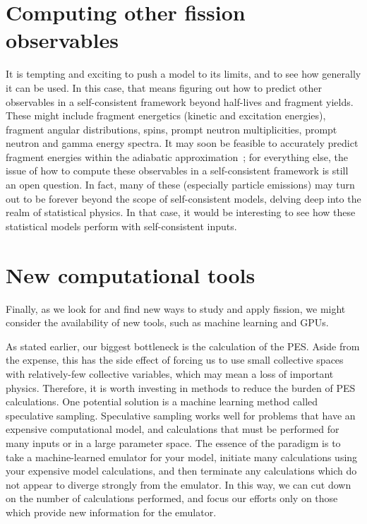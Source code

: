

\section{Computing other fission observables}
It is tempting and exciting to push a model to its limits, and to see how generally it can be used. In this case, that means figuring out how to predict other observables in a self-consistent framework beyond half-lives and fragment yields. These might include fragment energetics (kinetic and excitation energies), fragment angular distributions, spins, prompt neutron multiplicities, prompt neutron and gamma energy spectra. It may soon be feasible to accurately predict fragment energies within the adiabatic approximation~\cite{Younes2011}; for everything else, the issue of how to compute these observables in a self-consistent framework is still an open question. In fact, many of these (especially particle emissions) may turn out to be forever beyond the scope of self-consistent models, delving deep into the realm of statistical physics. In that case, it would be interesting to see how these statistical models perform with self-consistent inputs.



\section{New computational tools}
Finally, as we look for and find new ways to study and apply fission, we might consider the availability of new tools, such as machine learning and GPUs.

As stated earlier, our biggest bottleneck is the calculation of the PES. Aside from the expense, this has the side effect of forcing us to use small collective spaces with relatively-few collective variables, which may mean a loss of important physics. Therefore, it is worth investing in methods to reduce the burden of PES calculations. One potential solution is a machine learning method called speculative sampling. Speculative sampling works well for problems that have an expensive computational model, and calculations that must be performed for many inputs or in a large parameter space. The essence of the paradigm is to take a machine-learned emulator for your model, initiate many calculations using your expensive model calculations, and then terminate any calculations which do not appear to diverge strongly from the emulator. In this way, we can cut down on the number of calculations performed, and focus our efforts only on those which provide new information for the emulator.

